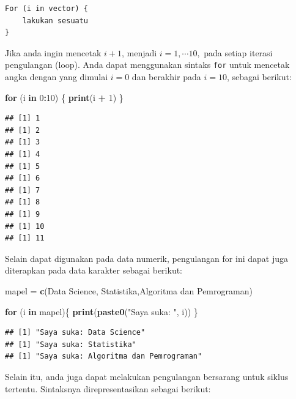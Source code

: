 \documentclass[
]{book}
\newenvironment{Shaded}{\begin{snugshade}}{\end{snugshade}}
\newcommand{\ControlFlowTok}[1]{\textcolor[rgb]{0.13,0.29,0.53}{\textbf{#1}}}
\newcommand{\DecValTok}[1]{\textcolor[rgb]{0.00,0.00,0.81}{#1}}
\newcommand{\FunctionTok}[1]{\textcolor[rgb]{0.13,0.29,0.53}{\textbf{#1}}}
\newcommand{\NormalTok}[1]{#1}
\newcommand{\OtherTok}[1]{\textcolor[rgb]{0.56,0.35,0.01}{#1}}
\newcommand{\SpecialCharTok}[1]{\textcolor[rgb]{0.81,0.36,0.00}{\textbf{#1}}}
\newcommand{\StringTok}[1]{\textcolor[rgb]{0.31,0.60,0.02}{#1}}
\begin{document}
\begin{verbatim}
For (i in vector) {
    lakukan sesuatu     
}
\end{verbatim}

Jika anda ingin mencetak \(i + 1\), menjadi \(i = 1,\cdots 10,\) pada setiap iterasi pengulangan (loop). Anda dapat menggunakan sintaks \texttt{for} untuk mencetak angka dengan yang dimulai \(i = 0\) dan berakhir pada \(i = 10\), sebagai berikut:

\begin{Shaded}
\begin{Highlighting}[]
\ControlFlowTok{for}\NormalTok{ (i }\ControlFlowTok{in} \DecValTok{0}\SpecialCharTok{:}\DecValTok{10}\NormalTok{) \{}
  \FunctionTok{print}\NormalTok{(i }\SpecialCharTok{+} \DecValTok{1}\NormalTok{)}
\NormalTok{\}}
\end{Highlighting}
\end{Shaded}

\begin{verbatim}
## [1] 1
## [1] 2
## [1] 3
## [1] 4
## [1] 5
## [1] 6
## [1] 7
## [1] 8
## [1] 9
## [1] 10
## [1] 11
\end{verbatim}

Selain dapat digunakan pada data numerik, pengulangan for ini dapat juga diterapkan pada data karakter sebagai berikut:

\begin{Shaded}
\begin{Highlighting}[]
\NormalTok{mapel }\OtherTok{=} \FunctionTok{c}\NormalTok{(}\StringTok{\textquotesingle{}Data Science\textquotesingle{}}\NormalTok{, }\StringTok{\textquotesingle{}Statistika\textquotesingle{}}\NormalTok{,}\StringTok{\textquotesingle{}Algoritma dan Pemrograman\textquotesingle{}}\NormalTok{)}

\ControlFlowTok{for}\NormalTok{ (i }\ControlFlowTok{in}\NormalTok{ mapel)\{}
   \FunctionTok{print}\NormalTok{(}\FunctionTok{paste0}\NormalTok{(}\StringTok{"Saya suka: "}\NormalTok{, i))}
\NormalTok{\}}
\end{Highlighting}
\end{Shaded}

\begin{verbatim}
## [1] "Saya suka: Data Science"
## [1] "Saya suka: Statistika"
## [1] "Saya suka: Algoritma dan Pemrograman"
\end{verbatim}

Selain itu, anda juga dapat melakukan pengulangan bersarang untuk siklus tertentu. Sintaksnya direpresentasikan sebagai berikut:
\end{document}
